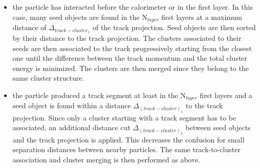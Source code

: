 \documentclass[cits]{JINST}
\begin{document}
\begin{itemize}
  \item the particle has interacted before the calorimeter or in the first layer. In this case, many seed objects are found in the N$_{layer}$ first layers at a maximum distance of $\Delta_{{track-cluster}_1}$ of the track projection. Seed objects are then sorted by their distance to the track projection. The clusters associated to their seeds are then associated to the track progressively starting from the closest one until the difference between the track momentum and the total cluster energy is minimized. The clusters are then merged since they belong to the same cluster structure.
  \item the particle produced a track segment at least in the N$_{layer}$ first layers and a seed object is found within a distance $\Delta_{(track-cluster)_1}$ to the track projection. Since only a cluster starting with a track segment has to be associated, an additional distance cut $\Delta_{(track-cluster)_2}$ between seed objects and the track projection is applied. This decreases the confusion for small separation distances between nearby particles. The same track-to-cluster association and cluster merging is then performed as above.
\end{itemize}
\end{document}
